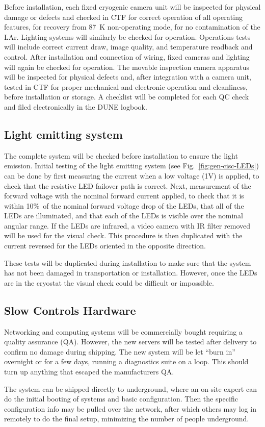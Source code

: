 Before installation, each fixed cryogenic camera unit will be inspected for physical damage or defects and checked in CTF for correct operation of all operating features, for recovery from \SI{87}{K} non-operating mode, for no contamination of the LAr. Lighting systems will similarly be checked for operation. Operations tests will include correct current draw, image quality, and temperature readback and control. After installation and connection of wiring, fixed cameras and lighting will again be checked for operation. The movable inspection camera apparatus will be inspected for physical defects and, after integration with a camera unit, tested in CTF for proper mechanical and electronic operation and cleanliness, before installation or storage. A checklist will be completed for each QC check and filed electronically in the DUNE logbook. 

\subsection{Light emitting system}
\label{sec:fdgen-slow-cryo-qc-les}

The complete system will be checked before installation to ensure the light emission. 
Initial testing of the light emitting system (see Fig.~\ref{fig:gen-cisc-LEDs}) can be done by first
measuring the current when a low voltage (1V) is applied, to check
that the resistive LED failover path is correct. Next, measurement
of the forward voltage with the nominal forward current applied, to
check that it is within 10\%\ of the nominal forward voltage drop of
the LEDs, that all of the LEDs are illuminated, and that each of the
LEDs is visible over the nominal angular range. If the LEDs are
infrared, a video camera with IR filter removed will be used for the
visual check. This procedure is then duplicated with the current
reversed for the LEDs oriented in the opposite direction.  

These tests will be duplicated during
installation to make sure that the system has
not been damaged in transportation or installation. However, once
the LEDs are in the cryostat the visual check could be difficult or impossible.


\subsection{Slow Controls Hardware}
\label{sec:fdgen-slow-cryo-qc-sc-hard}

Networking and computing systems will be commercially bought requiring a quality assurance (QA). However, the new servers will be tested after delivery to confirm no damage during shipping. The new system will be let ``burn in'' overnight or for a few days, running a diagnostics suite on a loop. This should turn up anything that escaped the manufacturers QA.

The system can be shipped directly to underground, where an on-site
expert can do the initial booting of systems and basic
configuration. Then the specific configuration info may be pulled over
the network, after which others may log in remotely to do the final
setup, minimizing the number of people underground.

 
